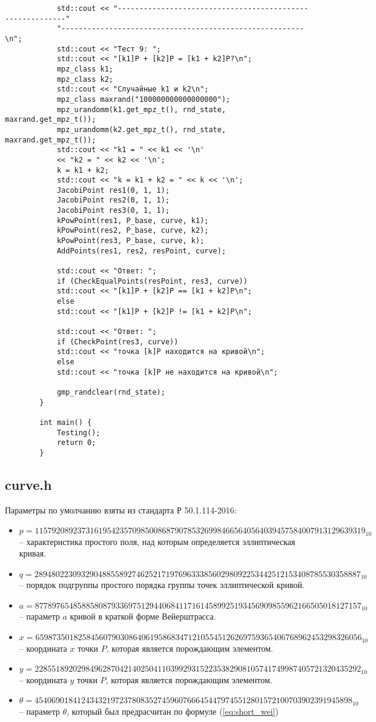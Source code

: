 \documentclass[a4paper,12pt]{article}
\begin{document}
\begin{verbatim}
			std::cout << "----------------------------------------------------------"
			"--------------------------------------------------------\n";
			std::cout << "Тест 9: ";
			std::cout << "[k1]P + [k2]P = [k1 + k2]P?\n";
			mpz_class k1;
			mpz_class k2;
			std::cout << "Случайные k1 и k2\n";
			mpz_class maxrand("100000000000000000");
			mpz_urandomm(k1.get_mpz_t(), rnd_state, maxrand.get_mpz_t());
			mpz_urandomm(k2.get_mpz_t(), rnd_state, maxrand.get_mpz_t());
			std::cout << "k1 = " << k1 << '\n'
			<< "k2 = " << k2 << '\n';
			k = k1 + k2;
			std::cout << "k = k1 + k2 = " << k << '\n';
			JacobiPoint res1(0, 1, 1);
			JacobiPoint res2(0, 1, 1);
			JacobiPoint res3(0, 1, 1);
			kPowPoint(res1, P_base, curve, k1);
			kPowPoint(res2, P_base, curve, k2);
			kPowPoint(res3, P_base, curve, k);
			AddPoints(res1, res2, resPoint, curve);
			
			std::cout << "Ответ: ";
			if (CheckEqualPoints(resPoint, res3, curve))
			std::cout << "[k1]P + [k2]P == [k1 + k2]P\n";
			else
			std::cout << "[k1]P + [k2]P != [k1 + k2]P\n";
			
			std::cout << "Ответ: ";
			if (CheckPoint(res3, curve))
			std::cout << "точка [k]P находится на кривой\n";
			else
			std::cout << "точка [k]P не находится на кривой\n";
			
			gmp_randclear(rnd_state);
		}
		
		int main() {
			Testing();
			return 0;
		}
	\end{verbatim}

	\subsection{curve.h}
	
	Параметры по умолчанию взяты из стандарта Р 50.1.114-2016:\\
	\begin{itemize}
		\item $p=115792089237316195423570985008687907853269984665640564039457584 007913129639319_{10}$ -- характеристика простого поля, над которым определяется эллиптическая кривая.
		\item $q=28948022309329048855892746252171976963338560298092253442512153408785530358887_{10}$ -- порядок подгруппы простого порядка группы точек эллиптической кривой.
		\item $a=87789765485885808793369751294406841171614589925193456909855962166505018127157_{10}$ -- параметр $a$ кривой в краткой форме Вейерштрасса.
		\item $x=65987350182584560790308640619586834712105545126269759365406768962453298326056_{10}$ -- координата $x$ точки $P$, которая является порождающим элементом.
		\item $y=22855189202984962870421402504110399293152235382908105741749987405721320435292_{10}$ -- координата $y$ точки $P$, которая является порождающим элементом.
		\item $\theta=454069018412434321972378083527459607666454479745512801572100703 902391945898_{10}$ -- параметр $\theta$, который был предрасчитан по формуле (\ref{eq:short_wei})
	\end{itemize}
\end{document}
